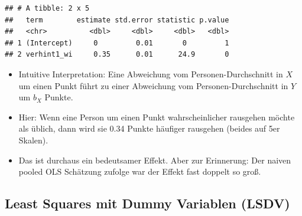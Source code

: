 \documentclass[]{book}
\newenvironment{Shaded}{\begin{snugshade}}{\end{snugshade}}
\newcommand{\DataTypeTok}[1]{\textcolor[rgb]{0.13,0.29,0.53}{#1}}
\newcommand{\DecValTok}[1]{\textcolor[rgb]{0.00,0.00,0.81}{#1}}
\newcommand{\KeywordTok}[1]{\textcolor[rgb]{0.13,0.29,0.53}{\textbf{#1}}}
\newcommand{\NormalTok}[1]{#1}
\newcommand{\OperatorTok}[1]{\textcolor[rgb]{0.81,0.36,0.00}{\textbf{#1}}}
\newcommand{\StringTok}[1]{\textcolor[rgb]{0.31,0.60,0.02}{#1}}
\providecommand{\tightlist}{%
  \setlength{\itemsep}{0pt}\setlength{\parskip}{0pt}}
\begin{document}
\begin{Shaded}
\end{Shaded}

\begin{verbatim}
## # A tibble: 2 x 5
##   term        estimate std.error statistic p.value
##   <chr>          <dbl>     <dbl>     <dbl>   <dbl>
## 1 (Intercept)     0         0.01       0         1
## 2 verhint1_wi     0.35      0.01      24.9       0
\end{verbatim}

\begin{itemize}
\tightlist
\item
  Intuitive Interpretation: Eine Abweichung vom Personen-Durchschnitt in \(X\) um einen Punkt führt zu einer Abweichung vom Personen-Durchschnitt in \(Y\) um \(b_{X}\) Punkte.
\item
  Hier: Wenn eine Person um einen Punkt wahrscheinlicher rausgehen möchte als üblich, dann wird sie 0.34 Punkte häufiger rausgehen (beides auf 5er Skalen).
\item
  Das ist durchaus ein bedeutsamer Effekt. Aber zur Erinnerung: Der naiven pooled OLS Schätzung zufolge war der Effekt fast doppelt so groß.
\end{itemize}

\hypertarget{least-squares-mit-dummy-variablen-lsdv}{%
\subsection*{Least Squares mit Dummy Variablen (LSDV)}\label{least-squares-mit-dummy-variablen-lsdv}}

\begin{Shaded}
\end{Shaded}
\end{document}
